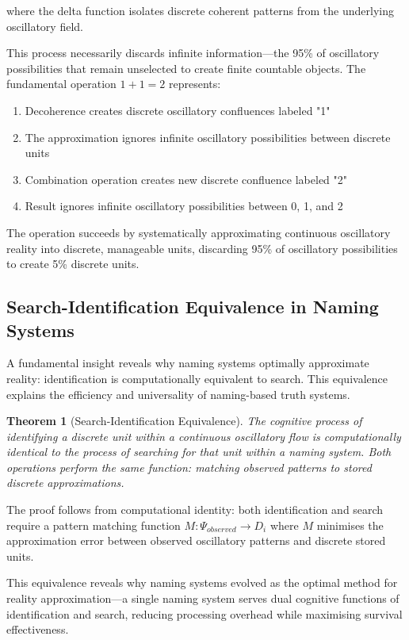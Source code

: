 \documentclass[12pt,a4paper]{article}
\newtheorem{theorem}{Theorem}
\begin{document}
where the delta function isolates discrete coherent patterns from the underlying oscillatory field.

This process necessarily discards infinite information—the 95\% of oscillatory possibilities that remain unselected to create finite countable objects. The fundamental operation $1 + 1 = 2$ represents:

\begin{enumerate}
\item Decoherence creates discrete oscillatory confluences labeled "1"
\item The approximation ignores infinite oscillatory possibilities between discrete units
\item Combination operation creates new discrete confluence labeled "2"
\item Result ignores infinite oscillatory possibilities between 0, 1, and 2
\end{enumerate}

The operation succeeds by systematically approximating continuous oscillatory reality into discrete, manageable units, discarding 95\% of oscillatory possibilities to create 5\% discrete units.

\subsection{Search-Identification Equivalence in Naming Systems}

A fundamental insight reveals why naming systems optimally approximate reality: identification is computationally equivalent to search. This equivalence explains the efficiency and universality of naming-based truth systems.

\begin{theorem}[Search-Identification Equivalence]
The cognitive process of identifying a discrete unit within a continuous oscillatory flow is computationally identical to the process of searching for that unit within a naming system. Both operations perform the same function: matching observed patterns to stored discrete approximations.
\end{theorem}

The proof follows from computational identity: both identification and search require a pattern matching function $M: \Psi_{observed} \to D_i$ where $M$ minimises the approximation error between observed oscillatory patterns and discrete stored units.

This equivalence reveals why naming systems evolved as the optimal method for reality approximation—a single naming system serves dual cognitive functions of identification and search, reducing processing overhead while maximising survival effectiveness.
\end{document}
